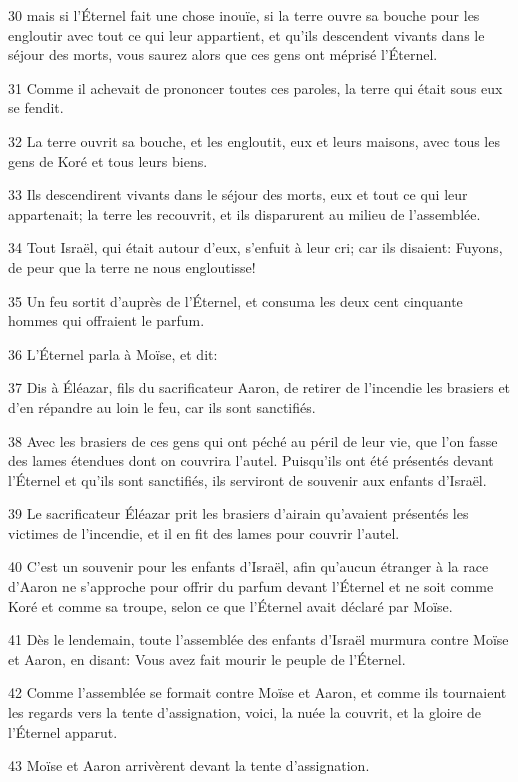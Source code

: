 \par 30 mais si l'Éternel fait une chose inouïe, si la terre ouvre sa bouche pour les engloutir avec tout ce qui leur appartient, et qu'ils descendent vivants dans le séjour des morts, vous saurez alors que ces gens ont méprisé l'Éternel.
\par 31 Comme il achevait de prononcer toutes ces paroles, la terre qui était sous eux se fendit.
\par 32 La terre ouvrit sa bouche, et les engloutit, eux et leurs maisons, avec tous les gens de Koré et tous leurs biens.
\par 33 Ils descendirent vivants dans le séjour des morts, eux et tout ce qui leur appartenait; la terre les recouvrit, et ils disparurent au milieu de l'assemblée.
\par 34 Tout Israël, qui était autour d'eux, s'enfuit à leur cri; car ils disaient: Fuyons, de peur que la terre ne nous engloutisse!
\par 35 Un feu sortit d'auprès de l'Éternel, et consuma les deux cent cinquante hommes qui offraient le parfum.
\par 36 L'Éternel parla à Moïse, et dit:
\par 37 Dis à Éléazar, fils du sacrificateur Aaron, de retirer de l'incendie les brasiers et d'en répandre au loin le feu, car ils sont sanctifiés.
\par 38 Avec les brasiers de ces gens qui ont péché au péril de leur vie, que l'on fasse des lames étendues dont on couvrira l'autel. Puisqu'ils ont été présentés devant l'Éternel et qu'ils sont sanctifiés, ils serviront de souvenir aux enfants d'Israël.
\par 39 Le sacrificateur Éléazar prit les brasiers d'airain qu'avaient présentés les victimes de l'incendie, et il en fit des lames pour couvrir l'autel.
\par 40 C'est un souvenir pour les enfants d'Israël, afin qu'aucun étranger à la race d'Aaron ne s'approche pour offrir du parfum devant l'Éternel et ne soit comme Koré et comme sa troupe, selon ce que l'Éternel avait déclaré par Moïse.
\par 41 Dès le lendemain, toute l'assemblée des enfants d'Israël murmura contre Moïse et Aaron, en disant: Vous avez fait mourir le peuple de l'Éternel.
\par 42 Comme l'assemblée se formait contre Moïse et Aaron, et comme ils tournaient les regards vers la tente d'assignation, voici, la nuée la couvrit, et la gloire de l'Éternel apparut.
\par 43 Moïse et Aaron arrivèrent devant la tente d'assignation.
